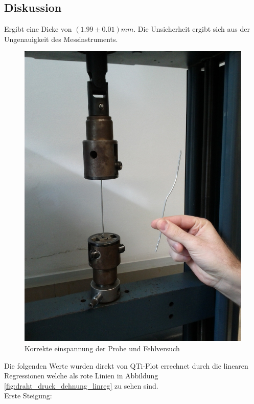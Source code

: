 \documentclass[12pt,a4paper]{article}
\begin{document}
\begin{multicols}{2}

\section{Diskussion}
Ergibt eine Dicke von \textbf{$(1.99 \pm 0.01)mm$}. Die Unsicherheit ergibt sich aus der Ungenauigkeit des Messinstruments.
\begin{figure}[H]
	\centering
  	\includegraphics[scale=0.25]{./figure/zugversuch_fail.jpg}
	\caption{Korrekte einspannung der Probe und Fehlversuch}
	\label{fig:draht_fehlversuch}
\end{figure}
\noindent
Die folgenden Werte wurden direkt von QTi-Plot errechnet durch die linearen Regressionen welche als rote Linien in Abbildung \ref{fig:draht_druck_dehnung_linreg} zu sehen sind.\\
Erste Steigung:\\

\end{multicols}
\end{document}
